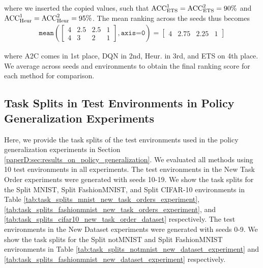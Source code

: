 where we inserted the copied values, such that ${\text{ACC}}_{\text{ETS}}^{1} = {\text{ACC}}_{\text{ETS}}^{2} = 90\%$ and ${\text{ACC}}_{\text{Heur}}^{1} = {\text{ACC}}_{\text{Heur}}^{2} = 95\%$. The mean ranking across the seeds thus becomes
\vspace{2mm}
\begin{align*}
\texttt{mean}
\left(
\begin{bmatrix}
4 & 2.5 & 2.5 & 1 \\[3pt] 
4 & 3 & 2 & 1 
\end{bmatrix}, \texttt{axis=0} \right)
= 
\begin{bmatrix} 4 & 2.75 & 2.25 & 1  \end{bmatrix} 
\end{align*}

where A2C comes in 1st place, DQN in 2nd, Heur. in 3rd, and ETS on 4th place. We average across seeds and environments to obtain the final ranking score for each method for comparison. 





\subsection*{Task Splits in Test Environments in Policy Generalization Experiments}\label{paperD:app:task_split_tables}

Here, we provide the task splits of the test environments used in the policy generalization experiments in Section \ref{paperD:sec:results_on_policy_generalization}. We evaluated all methods using 10 test environments in all experiments.
The test environments in the New Task Order experiments were generated with seeds 10-19. We show the task splits for the Split MNIST, Split FashionMNIST, and Split CIFAR-10 environments in Table \ref{tab:task_splits_mnist_new_task_orders_experiment}, \ref{tab:task_splits_fashionmnist_new_task_orders_experiment}, and \ref{tab:task_splits_cifar10_new_task_order_dataset} respectively. 
The test environments in the New Dataset experiments were generated with seeds 0-9. We show the task splits for the Split notMNIST and Split FashionMNIST environments in Table \ref{tab:task_splits_notmnist_new_dataset_experiment} and \ref{tab:task_splits_fashionmnist_new_dataset_experiment} respectively. 



